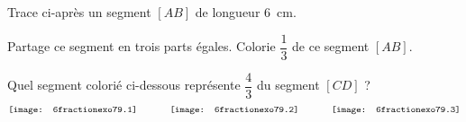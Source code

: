\begin{myenumerate}
    \item Trace ci-après un segment $[AB]$ de longueur 6~cm.
\vspace{1cm}
    \item Partage ce segment en trois parts égales. Colorie $\dfrac13$
      de ce segment $[AB]$.
    \item Quel segment colorié ci-dessous représente $\dfrac43$ du
      segment $[CD]$ ?
      \[\texttt{[image: 6fractionexo79.1]}\kern0.1\linewidth\texttt{[image: 6fractionexo79.2]}\kern0.1\linewidth\texttt{[image: 6fractionexo79.3]}\]
\end{myenumerate}
